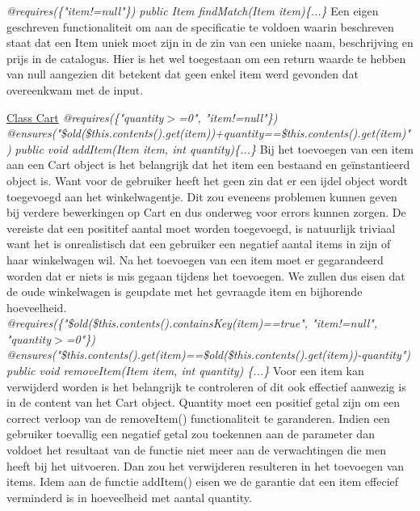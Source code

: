\documentclass{article}
\begin{document}
\noindent
\textit{@requires(\{"item!=null"\})}\newline
\textit{public Item findMatch(Item item)\{...\}}\newline
Een eigen geschreven functionaliteit om aan de specificatie te voldoen waarin beschreven staat dat een Item uniek moet zijn in de zin van een unieke naam, beschrijving en prijs in de catalogus. Hier is het wel toegestaan om een return waarde te hebben van null aangezien dit betekent dat geen enkel item werd gevonden dat overeenkwam met de input. \\

\newpage

\noindent
\underline{Class Cart}\newline
\textit{@requires(\{"quantity$>$=0", "item!=null"\})}\newline
\textit{@ensures("\$old(\$this.contents().get(item))+quantity==\$this.contents().get(item)")}\newline
\textit{public void addItem(Item item, int quantity)\{...\}}\newline
Bij het toevoegen van een item aan een Cart object is het belangrijk dat het item een bestaand en ge\"{i}nstantieerd object is. Want voor de gebruiker heeft het geen zin dat er een ijdel object wordt toegevoegd aan het winkelwagentje. Dit zou eveneens problemen kunnen geven bij verdere bewerkingen op Cart en dus onderweg voor errors kunnen zorgen. De vereiste dat een posititef aantal moet worden toegevoegd, is natuurlijk triviaal want het is onrealistisch dat een gebruiker een negatief aantal items in zijn of haar winkelwagen wil.\newline
Na het toevoegen van een item moet er gegarandeerd worden dat er niets is mis gegaan tijdens het toevoegen. We zullen dus eisen dat de oude winkelwagen is geupdate met het gevraagde item en bijhorende hoeveelheid. \\

\noindent
\textit{@requires(\{"\$old(\$this.contents().containsKey(item)==true", "item!=null", "quantity$>$=0"\})} \newline
\textit{@ensures("\$this.contents().get(item)==\$old(\$this.contents().get(item))-quantity")} \newline
\textit{public void removeItem(Item item, int quantity) \{...\}} \newline
Voor een item kan verwijderd worden is het belangrijk te controleren of dit ook effectief aanwezig is in de content van het Cart object. Quantity moet een positief getal zijn om een correct verloop van de removeItem() functionaliteit te garanderen. Indien een gebruiker toevallig een negatief getal zou toekennen aan de parameter dan voldoet het resultaat van de functie niet meer aan de verwachtingen die men heeft bij het uitvoeren. Dan zou het verwijderen resulteren in het toevoegen van items. Idem aan de functie addItem() eisen we de garantie dat een item effecief verminderd is in hoeveelheid met aantal quantity. \\
\end{document}
